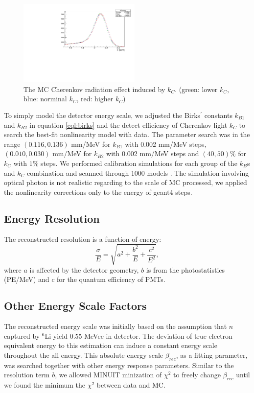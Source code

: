 \begin{figure}[h!]
\centering
\includegraphics[width=60mm]{Figures/kc.pdf}
\caption{The MC Cherenkov radiation effect induced by $k_{C}$. (green: lower $k_{C}$, blue: norminal $k_{C}$, red: higher $k_{C}$)}
\label{fig:kcplot}
\end{figure}

To simply model the detector energy scale, we adjusted the Birks$^\prime$ constants $k_{B1}$ and $k_{B2}$ in equation \ref{eql:birks} and the detect efficiency of Cherenkov light $k_C$ to search the best-fit nonlinearity model with data. The parameter search was in the range $(0.116, 0.136)$ mm/MeV for $k_{B1}$ with 0.002 mm/MeV steps, $(0.010, 0.030)$ mm/MeV for $k_{B2}$ with 0.002 mm/MeV steps and $(40, 50)\%$ for $k_C$ with $1\%$ steps. 
We performed calibration simulations for each group of the $k_B$s and $k_C$ combination and scanned through 1000 models .
The simulation involving optical photon is not realistic regarding to the scale of MC processed, we applied the nonlinearity corrections only to the energy of geant4 steps.

\subsection{Energy Resolution}
\label{sec:resolution}
The reconstructed resolution is a function of energy:
\begin{equation}
\label{eql:resolution}
    \frac{\sigma}{E} = \sqrt{a^2 + \frac{b^2}{E}+\frac{c^2}{E^2}},
\end{equation}
where $a$ is affected by the detector geometry, $b$ is from the photostatistics (PE/MeV) and $c$ for the quantum efficiency of PMTs.


\subsection{Other Energy Scale Factors}
\label{sec:other}
The reconstructed energy scale was initially based on the assumption that $n$ captured by $^6$Li yield 0.55 MeVee in detector. 
The deviation of true electron equivalent energy to this estimation can induce a constant energy scale throughout the all energy. 
This absolute energy scale $\beta_{rec}$, as a fitting parameter, was searched together with other energy response parameters.
Similar to the resolution term $b$, we allowed MINUIT minization of $\chi^2$ to freely change $\beta_{rec}$ until we found the minimum the $\chi^2$ between data and MC.


